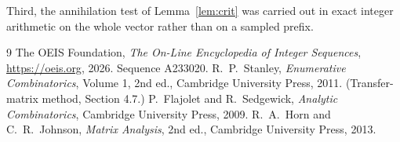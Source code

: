 \documentclass[11pt,a4paper]{article}
\theoremstyle{plain}
\theoremstyle{definition}
\begin{document}
Third, the annihilation test of Lemma~\ref{lem:crit} was carried out in exact integer
arithmetic on the whole vector rather than on a sampled prefix.

\begin{thebibliography}{9}
 The OEIS Foundation, \emph{The On-Line Encyclopedia of Integer
Sequences}, \url{https://oeis.org}, 2026. Sequence A233020.
 R.~P.~Stanley, \emph{Enumerative Combinatorics}, Volume 1, 2nd ed.,
Cambridge University Press, 2011. (Transfer-matrix method, Section 4.7.)
 P.~Flajolet and R.~Sedgewick, \emph{Analytic Combinatorics}, Cambridge
University Press, 2009.
 R.~A.~Horn and C.~R.~Johnson, \emph{Matrix Analysis}, 2nd ed., Cambridge
University Press, 2013.
\end{thebibliography}
\end{document}
